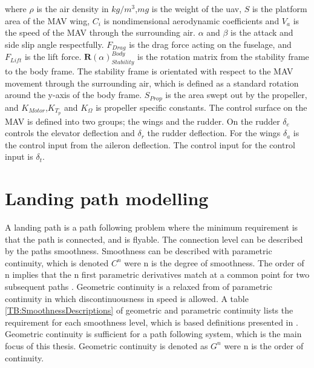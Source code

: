 where $\rho$ is the air density in $kg/m^3$,$mg$ is the weight of the \gls{uav}, $S$ is the platform area of the MAV wing, $C_i$ is nondimensional aerodynamic coefficients and $V_a$ is the speed of the MAV through the surrounding air. $\alpha$ and $\beta$ is the attack and side slip angle respectfully. $F_{Drag}$ is the drag force acting on the fuselage, and $F_{Lift}$ is the lift force. $\mathbf{R}(\alpha)_{Stability}^{Body}$ is the rotation matrix from the stability frame to the body frame. The stability frame is orientated with respect to the MAV movement through the surrounding air, which is defined as a standard rotation around the y-axis of the body frame. $S_{Prop}$ is the area swept out by the propeller, and $K_{Motor}$,$K_{T_p}$ and $K_\Omega$ is propeller specific constants. The control surface on the MAV is defined into two groups; the wings and the rudder. On the rudder $\delta_e$ controls the elevator deflection and $\delta_r$ the rudder deflection. For the wings $\delta_a$ is the control input from the aileron deflection. The control input for the control input is $\delta_t$.
\section{Landing path modelling}
A landing path is a path following problem where the minimum requirement is that the path is connected, and is flyable. The connection level can be described by the paths smoothness. Smoothness can be described with parametric continuity, which is denoted $C^n$ were n is the degree of smoothness. The order of n implies that the n first parametric derivatives match at a common point for two subsequent paths \citep{barsky1989geometric}. Geometric continuity is a relaxed from of parametric continuity in which discontinuousness in speed is allowed. A table \ref{TB:SmoothnessDescriptions} of geometric and parametric continuity lists the requirement for each smoothness level, which is based definitions presented in \citep{barsky1989geometric}.
Geometric continuity is sufficient for a path following system, which is the main focus of this thesis. Geometric continuity is denoted as $G^n$ were n is the order of continuity.

